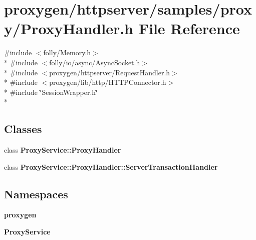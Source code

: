 \section{proxygen/httpserver/samples/proxy/\+Proxy\+Handler.h File Reference}
\label{ProxyHandler_8h}
{\ttfamily \#include $<$folly/\+Memory.\+h$>$}\\*
{\ttfamily \#include $<$folly/io/async/\+Async\+Socket.\+h$>$}\\*
{\ttfamily \#include $<$proxygen/httpserver/\+Request\+Handler.\+h$>$}\\*
{\ttfamily \#include $<$proxygen/lib/http/\+H\+T\+T\+P\+Connector.\+h$>$}\\*
{\ttfamily \#include \char`\"{}Session\+Wrapper.\+h\char`\"{}}\\*
\subsection*{Classes}
\begin{DoxyCompactItemize}
\item 
class {\bf Proxy\+Service\+::\+Proxy\+Handler}
\item 
class {\bf Proxy\+Service\+::\+Proxy\+Handler\+::\+Server\+Transaction\+Handler}
\end{DoxyCompactItemize}
\subsection*{Namespaces}
\begin{DoxyCompactItemize}
\item 
 {\bf proxygen}
\item 
 {\bf Proxy\+Service}
\end{DoxyCompactItemize}
